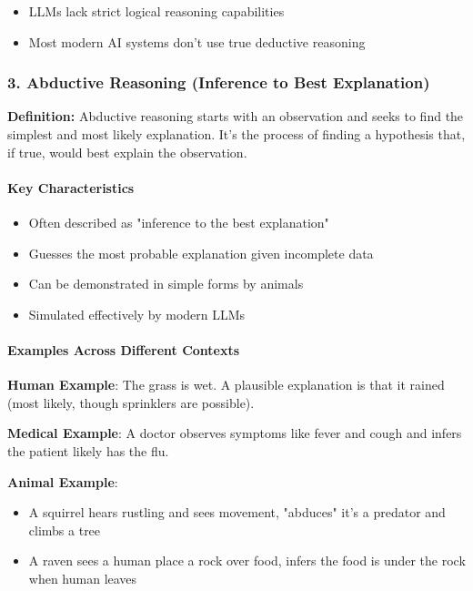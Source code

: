 \begin{itemize}
\item LLMs lack strict logical reasoning capabilities
\item Most modern AI systems don't use true deductive reasoning
\end{itemize}

\subsubsection{3. Abductive Reasoning (Inference to Best Explanation)}

\textbf{Definition:} Abductive reasoning starts with an observation and seeks to find the simplest and most likely explanation. It's the process of finding a hypothesis that, if true, would best explain the observation.

\paragraph{Key Characteristics}

\begin{itemize}
\item Often described as "inference to the best explanation"
\item Guesses the most probable explanation given incomplete data
\item Can be demonstrated in simple forms by animals
\item Simulated effectively by modern LLMs
\end{itemize}

\paragraph{Examples Across Different Contexts}

\textbf{Human Example}: The grass is wet. A plausible explanation is that it rained (most likely, though sprinklers are possible).

\textbf{Medical Example}: A doctor observes symptoms like fever and cough and infers the patient likely has the flu.

\textbf{Animal Example}:

\begin{itemize}
\item A squirrel hears rustling and sees movement, "abduces" it's a predator and climbs a tree
\item A raven sees a human place a rock over food, infers the food is under the rock when human leaves
\end{itemize}

